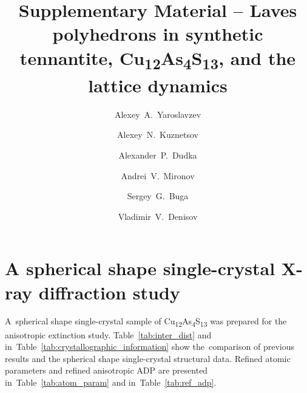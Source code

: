 \documentclass[preprint,review,12pt]{elsarticle}
\begin{document}
\begin{frontmatter}



\title{Supplementary Material \--- Laves polyhedrons in synthetic tennantite, Cu\textsubscript{12}As\textsubscript{4}S\textsubscript{13}, and the lattice dynamics}

\author[TISNCM]{Alexey~A.~Yaroslavzev}
\author[MSU,ICRAS]{Alexey~N.~Kuznetsov}
\author[SIC]{Alexander~P.~Dudka}
\author[MSU]{Andrei~V.~Mironov}
\author[MIPT,TISNCM]{Sergey~G.~Buga}
\author[TISNCM]{Vladimir~V.~Denisov}

\address[TISNCM]{Technological Institute for Superhard and Novel Carbon Materials, 108840, Troitsk, Moscow, Russia}
\address[MSU]{Department of Chemistry, Lomonosov Moscow State University, 119991, Moscow, Russia}
\address[ICRAS]{Kurnakov Institute of General and Inorganic Chemistry RAS, 119991, Moscow, Russia}
\address[SIC]{Shubnikov Institute of Crystallography of Federal Scientific Research Centre “Crystallography and Photonics” of Russian Academy of Sciences, Leninskiy Prospekt 59, 119333, Moscow, Russia}
\address[MIPT]{Moscow Institute of Physics and Technology, 141700, 9 Institutsky lane, Dolgoprudny, Russia}


\end{frontmatter}


\section{A spherical shape single-crystal X-ray diffraction study}\label{sec:level1}

A~spherical shape single-crystal sample of Cu\textsubscript{12}As\textsubscript{4}S\textsubscript{13}  was prepared for the anisotropic extinction study.
Table~\ref{tab:inter_dist} and in~Table~\ref{tab:crystallographic_information} show the~comparison of previous results\cite{yaroslavzev2019} and the spherical shape single-crystal structural data. Refined atomic parameters and refined anisotropic ADP are presented in~Table~\ref{tab:atom_param} and in~Table~\ref{tab:ref_adp}.
\end{document}
